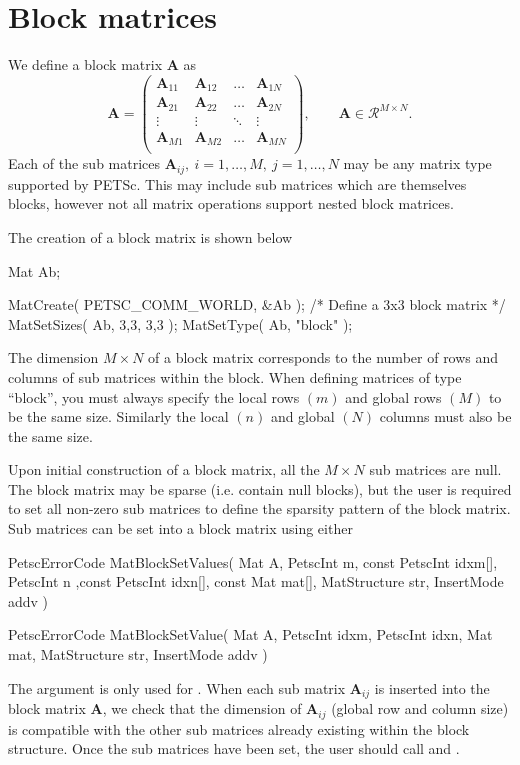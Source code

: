 \documentclass[10pt,a4paper]{amsart}
\renewcommand{\v}[1]{\boldsymbol{#1}}		%
\newcommand{\m}[1]{\boldsymbol{#1}}		%
\newcommand{\code}[1]{{\fontfamily{txtt}\selectfont {#1}}}
\begin{document}
\section{Block matrices}
	We define a block matrix $\m A$ as
\begin{equation}
\m A = 
\begin{pmatrix}
	\m A_{11}		&\m A_{12} 	&\dots 	&\m A_{1N} \\
	\m A_{21}		&\m A_{22} 	&\dots 	&\m A_{2N} \\
	\vdots		&\vdots		&\ddots	&\vdots \\
	\m A_{M1}	&\m A_{M2} 	&\dots 	&\m A_{MN} \\
\end{pmatrix}, \qquad \m A \in \mathcal R^{M \times N}.
\end{equation}
Each of the sub matrices $\v A_{ij}, \medspace i=1,\dots, M, \medspace j=1,\dots, N$ may be any matrix type supported by PETSc. This may include sub matrices which are themselves blocks, however not all matrix operations support nested block matrices. 
	
The creation of a block matrix is shown below
\begin{verbatimtab}[4]
	Mat Ab;
	
	MatCreate( PETSC_COMM_WORLD, &Ab );
	/* Define a 3x3 block matrix */
	MatSetSizes( Ab, 3,3, 3,3 );
	MatSetType( Ab, "block" );
\end{verbatimtab}
The dimension $M \times N$ of a block matrix corresponds to the number of rows and columns of sub matrices within the block. When defining matrices of type ``block'', you must always specify the local rows $(m)$ and global rows $(M)$ to be the same size. Similarly the local $(n)$ and global $(N)$ columns must also be the same size.   

Upon initial construction of a  block matrix, all the $M \times N$ sub matrices are null. The block matrix may be sparse (i.e. contain null blocks), but the user is required to set all non-zero sub matrices to define the sparsity pattern of the block matrix. Sub matrices can be set into a block matrix using either
\begin{verbatimtab}[4]
	PetscErrorCode MatBlockSetValues( Mat A, 
		PetscInt m, const PetscInt idxm[], 
		PetscInt n ,const PetscInt idxn[], 
		const Mat mat[], MatStructure str, InsertMode addv )
		
	PetscErrorCode MatBlockSetValue( Mat A, PetscInt idxm, PetscInt idxn, 
		Mat mat, MatStructure str, InsertMode addv )
\end{verbatimtab}
The argument \code{str} is only used for \code{addv=ADD\_VALUES}. When each sub matrix $\m A_{ij}$ is inserted into the block matrix $\m A$, we check that the dimension of $\m A_{ij}$ (global row and column size) is compatible with the other sub matrices already existing within the block structure.
Once the sub matrices have been set, the user should call \code{MatAssemblyBegin()} and \code{MatAssemblyEnd()}. 
\end{document}
